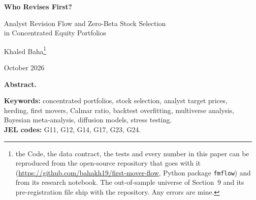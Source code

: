 \documentclass[11pt,a4paper]{article}
\begin{document}
\begin{titlepage}
\centering
\vspace*{2.2cm}
{\LARGE\bfseries Who Revises First?\par}
\vspace{0.5em}
{\Large Analyst Revision Flow and Zero-Beta Stock Selection\\ in Concentrated Equity Portfolios\par}
\vspace{1.6em}
{\large Khaled Baha\footnote{the Code, the data contract, the tests and every number in this paper can be reproduced from the open-source repository that goes with it (\url{https://github.com/bahakh19/first-mover-flow}, Python package \texttt{fmflow}) and from its research notebook. The out-of-sample universe of Section~9 and its pre-registration file ship with the repository. Any errors are mine.}\par}
\vspace{0.8em}
{October 2026\par}
\vspace{2em}
\begin{minipage}{0.88\textwidth}
\small
\noindent\textbf{Abstract.} 

\medskip
\noindent\textbf{Keywords:} concentrated portfolios, stock selection, analyst target prices, herding, first movers, Calmar ratio, backtest overfitting, multiverse analysis, Bayesian meta-analysis, diffusion models, stress testing.\\
\textbf{JEL codes:} G11, G12, G14, G17, G23, G24.
\end{minipage}
\end{titlepage}
















\appendix

\end{document}
